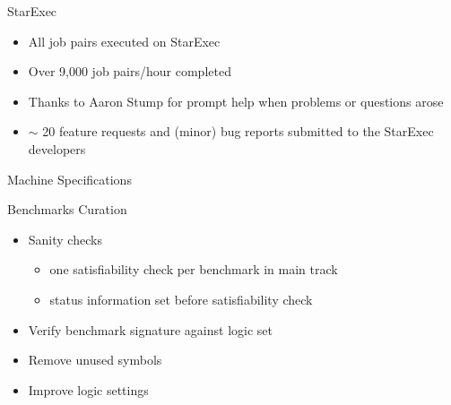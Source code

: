 \documentclass{beamer}
\begin{document}

\begin{frame}{StarExec}
  \begin{itemize}
  \item All job pairs executed on StarExec
  \item Over 9,000 job pairs/hour completed
  \end{itemize}

  \medskip
  
  \begin{center}
    {\Large{}}
  \end{center}

  \medskip
  
  \begin{itemize}
  \item Thanks to Aaron Stump for prompt help when problems or
    questions arose
  \item $\sim$ 20 feature requests and (minor) bug reports submitted
    to the StarExec developers
  \end{itemize}
\end{frame}


\begin{frame}{Machine Specifications}

\end{frame}


\begin{frame}{Benchmarks Curation}

\begin{itemize}

\item Sanity checks

\begin{itemize}

\item one satisfiability check per benchmark in main track

\item status information set before satisfiability check

\end{itemize}

\item Verify benchmark signature against logic set

\item Remove unused symbols

\item Improve logic settings

\end{itemize}

\end{frame}
\end{document}
